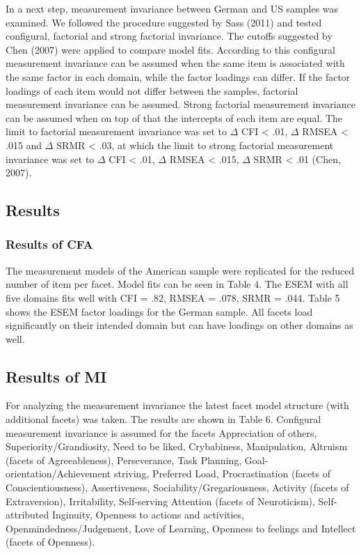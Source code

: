 \documentclass[floatsintext,man]{apa6}
\theoremstyle{definition}
\theoremstyle{definition}
\theoremstyle{definition}
\theoremstyle{remark}
\begin{document}
In a next step, measurement invariance between German and US samples was
examined. We followed the procedure suggested by Sass (2011) and tested
configural, factorial and strong factorial invariance. The cutoffs
suggested by Chen (2007) were applied to compare model fits. According
to this configural measurement invariance can be assumed when the same
item is associated with the same factor in each domain, while the factor
loadings can differ. If the factor loadings of each item would not
differ between the samples, factorial measurement invariance can be
assumed. Strong factorial measurement invariance can be assumed when on
top of that the intercepts of each item are equal. The limit to
factorial measurement invariance was set to \(\Delta\) CFI \textless{}
.01, \(\Delta\) RMSEA \textless{} .015 and \(\Delta\) SRMR \textless{}
.03, at which the limit to strong factorial measurement invariance was
set to \(\Delta\) CFI \textless{} .01, \(\Delta\) RMSEA \textless{}
.015, \(\Delta\) SRMR \textless{} .01 (Chen, 2007).

\hypertarget{results-1}{%
\subsection{Results}\label{results-1}}

\hypertarget{results-of-cfa}{%
\subsubsection{Results of CFA}\label{results-of-cfa}}

The measurement models of the American sample were replicated for the
reduced number of item per facet. Model fits can be seen in Table 4. The
ESEM with all five domains fits well with CFI = .82, RMSEA = .078, SRMR
= .044. Table 5 shows the ESEM factor loadings for the German sample.
All facets load significantly on their intended domain but can have
loadings on other domains as well.

\hypertarget{results-of-mi}{%
\subsection{Results of MI}\label{results-of-mi}}

For analyzing the measurement invariance the latest facet model
structure (with additional facets) was taken. The results are shown in
Table 6. Configural measurement invariance is assumed for the facets
Appreciation of others, Superiority/Grandiosity, Need to be liked,
Crybabiness, Manipulation, Altruism (facets of Agreeableness),
Perseverance, Task Planning, Goal-orientation/Achievement striving,
Preferred Load, Procrastination (facets of Conscientiousness),
Assertiveness, Sociability/Gregariousness, Activity (facets of
Extraversion), Irritability, Self-serving Attention (facets of
Neuroticism), Self-attributed Inginuity, Openness to actions and
activities, Openmindedness/Judgement, Love of Learning, Openness to
feelings and Intellect (facets of Openness).
\end{document}
